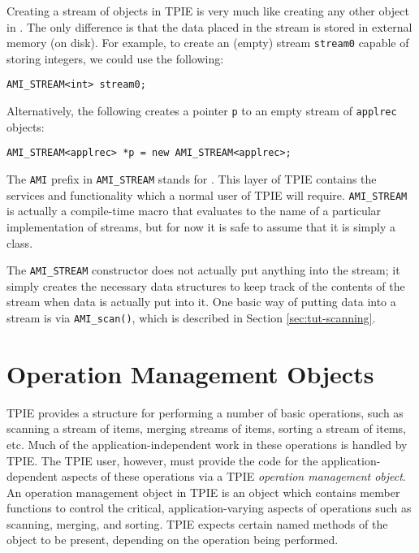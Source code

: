 Creating a stream of objects in TPIE is very much like
creating any other object in \CPP{}. The only difference is
that the data placed in the stream is stored in external
memory (on disk). 
For example, to create an (empty) stream \lstinline|stream0|
capable of storing integers, we could use the following:
\begin{lstlisting}
AMI_STREAM<int> stream0;
\end{lstlisting}
Alternatively, the following creates a pointer
\lstinline|p| to an empty stream of \lstinline|applrec| objects:
\begin{lstlisting}
AMI_STREAM<applrec> *p = new AMI_STREAM<applrec>;
\end{lstlisting}

The \lstinline|AMI| prefix in \lstinline|AMI_STREAM| stands for
. This layer of TPIE contains the
services and functionality which a normal user of TPIE will
require.  \lstinline|AMI_STREAM| is actually a compile-time macro
that evaluates to the name of a particular implementation of
streams, but for now it is safe to assume that it is simply
a \CPP{} class.

The \lstinline|AMI_STREAM| constructor does not actually put
anything into the stream; it simply creates the necessary
data structures to keep track of the contents of the stream
when data is actually put into it.  One basic way of putting
data into a stream is via \lstinline|AMI_scan()|, which is
described in Section \ref{sec:tut-scanning}.

\section{Operation Management Objects} 

TPIE provides a structure for performing a number of basic
operations, such as scanning a stream of items, merging
streams of items, sorting a stream of items, etc. Much of
the application-independent work in these operations is
handled by TPIE. The TPIE user, however, must provide the
code for the application-dependent aspects of these
operations via a TPIE {\em operation management object}. An
operation management object in TPIE is an object which
contains member functions to control the critical,
application-varying aspects of operations such as scanning,
merging, and sorting. TPIE expects certain named methods of
the object to be present, depending on the operation being
performed. 

